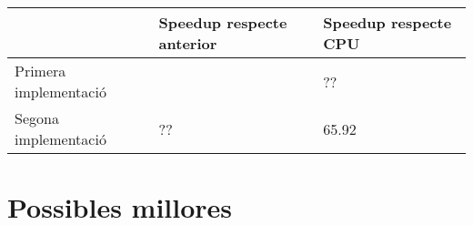 \documentclass[catalan,10pt,a4paper]{article}
\begin{document}
\begin{table}[h]
\centering
\begin{tabular}{|l|l|l|}
\hline
      & Speedup respecte anterior  & Speedup respecte CPU \\ \hline
Primera implementació  &  & ?? \\ \hline
Segona implementació   & ?? & 65.92  \\ \hline
\end{tabular}
\end{table}

\section*{Possibles millores}

\newpage


\end{document}

